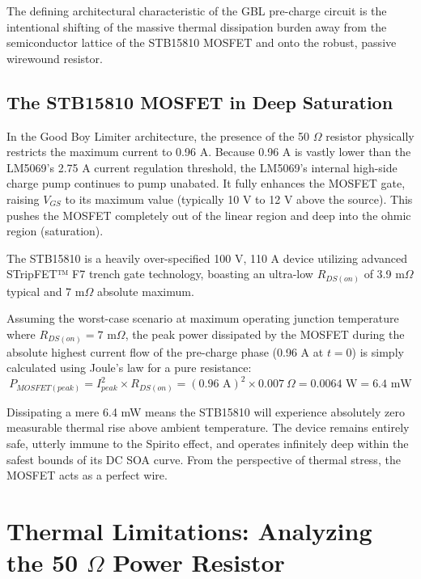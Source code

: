 \documentclass[11pt,a4paper]{article}
\begin{document}
The defining architectural characteristic of the GBL pre-charge circuit is the intentional shifting of the massive thermal dissipation burden away from the semiconductor lattice of the STB15810 MOSFET and onto the robust, passive wirewound resistor.

\subsection{The STB15810 MOSFET in Deep Saturation}

In the Good Boy Limiter architecture, the presence of the 50 $\Omega$ resistor physically restricts the maximum current to 0.96 A. Because 0.96 A is vastly lower than the LM5069's 2.75 A current regulation threshold, the LM5069's internal high-side charge pump continues to pump unabated. It fully enhances the MOSFET gate, raising $V_{GS}$ to its maximum value (typically 10 V to 12 V above the source). This pushes the MOSFET completely out of the linear region and deep into the ohmic region (saturation).

The STB15810 is a heavily over-specified 100 V, 110 A device utilizing advanced STripFET™ F7 trench gate technology, boasting an ultra-low $R_{DS(on)}$ of 3.9 m$\Omega$ typical and 7 m$\Omega$ absolute maximum. 

Assuming the worst-case scenario at maximum operating junction temperature where $R_{DS(on)} = 7 \text{ m}\Omega$, the peak power dissipated by the MOSFET during the absolute highest current flow of the pre-charge phase (0.96 A at $t=0$) is simply calculated using Joule's law for a pure resistance:
\begin{equation}
P_{MOSFET(peak)} = I_{peak}^2 \times R_{DS(on)} = (0.96 \text{ A})^2 \times 0.007\ \Omega = 0.0064 \text{ W} = 6.4 \text{ mW}
\end{equation}

Dissipating a mere 6.4 mW means the STB15810 will experience absolutely zero measurable thermal rise above ambient temperature. The device remains entirely safe, utterly immune to the Spirito effect, and operates infinitely deep within the safest bounds of its DC SOA curve. From the perspective of thermal stress, the MOSFET acts as a perfect wire.

\section{Thermal Limitations: Analyzing the 50 $\Omega$ Power Resistor}
\label{sec:thermal}
\end{document}
